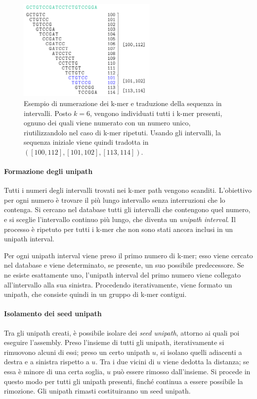 \documentclass[crop=false, class=book]{standalone}
\begin{document}
	\begin{figure}
		\centering
		\includegraphics[width=0.6\textwidth]{capitoli/allpaths/numbering.png}
		\caption{Esempio di numerazione dei k-mer e traduzione della sequenza in intervalli. Posto $k=6$, vengono individuati tutti i k-mer presenti, ognuno dei quali viene numerato con un numero unico, riutilizzandolo nel caso di k-mer ripetuti. Usando gli intervalli, la sequenza iniziale viene quindi tradotta in $([100,112], [101, 102], [113, 114])$.}
		\label{fig:allpathsnumbering}
	\end{figure}
	
	\paragraph{Formazione degli unipath}
	Tutti i numeri degli intervalli trovati nei k-mer path vengono scanditi. L'obiettivo per ogni numero è trovare il più lungo intervallo senza interruzioni che lo contenga. Si cercano nel database tutti gli intervalli che contengono quel numero, e si sceglie l'intervallo continuo più lungo, che diventa un \textit{unipath interval}. Il processo è ripetuto per tutti i k-mer che non sono stati ancora inclusi in un unipath interval. 
	
	Per ogni unipath interval viene preso il primo numero di k-mer; esso viene cercato nel database e viene determinato, se presente, un suo possibile predecessore. Se ne esiste esattamente uno, l'unipath interval del primo numero viene collegato all'intervallo alla sua sinistra. Procedendo iterativamente, viene formato un unipath, che consiste quindi in un gruppo di k-mer contigui. 
	
	\paragraph{Isolamento dei seed unipath}
	Tra gli unipath creati, è possibile isolare dei \textit{seed unipath}, attorno ai quali poi eseguire l'assembly. Preso l'insieme di tutti gli unipath, iterativamente si rimuovono alcuni di essi; preso un certo unipath $u$, si isolano quelli adiacenti a destra e a sinistra rispetto a $u$. Tra i due vicini di $u$ viene dedotta la distanza; se essa è minore di una certa soglia, $u$ può essere rimosso dall'insieme. Si procede in questo modo per tutti gli unipath presenti, finché continua a essere possibile la rimozione. Gli unipath rimasti costituiranno un seed unipath.
	
\end{document}
